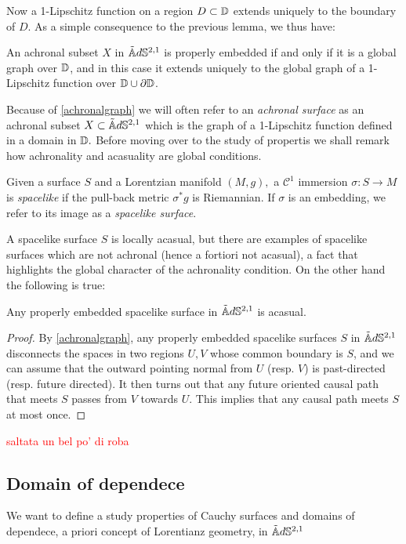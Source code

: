 Now a 1-Lipschitz function on a region $D\subset \mathbb{D}$ extends uniquely to the boundary of $D$. As a simple consequence to the previous lemma, we thus have: 

\begin{lemma}\label{achronalgraph}
    An achronal subset $X$ in $\tilde{\mathbb{A}}d\mathbb{S}^{2,1}$ is properly embedded if and only if it is a global graph over $\mathbb{D}$, and in this case it extends uniquely to the global graph of a 1-Lipschitz function over $\mathbb{D}\cup\partial\mathbb{D}$.
\end{lemma}

Because of \ref{achronalgraph} we will often refer to an \textit{achronal surface} as an achronal subset $X\subset\tilde{\mathbb{A}}d\mathbb{S}^{2,1}$ which is the graph of a 1-Lipschitz function defined in a domain in $\mathbb{D}.$ Before moving over to the study of propertis we shall remark how achronality and acasuality are global conditions.

\begin{definition} Given a surface $S$ and a Lorentzian manifold $(M,g),$ a $\mathcal{C}^1$ immersion $\sigma:S\to M$ is \textit{spacelike} if the pull-back metric $\sigma^*g$ is Riemannian. If $\sigma$ is an embedding, we refer to its image as a \textit{spacelike surface}.
\end{definition}

A spacelike surface $S$ is locally acasual, but there are examples of spacelike surfaces which are not achronal (hence a fortiori not acasual), a fact that highlights the global character of the achronality condition. On the other hand the following is true: 

\begin{lemma}
    Any properly embedded spacelike surface in $\tilde{\mathbb{A}}d\mathbb{S}^{2,1}$ is acasual. 
\end{lemma}
\begin{proof}
    By \ref{achronalgraph}, any properly embedded spacelike surfaces $S$ in $\tilde{\mathbb{A}}d\mathbb{S}^{2,1}$ disconnects the spaces in two regions $U,V$ whose common boundary is $S$, and we can assume that the outward pointing normal from $U$ (resp. $V$) is past-directed (resp. future directed). It then turns out that any future oriented causal path that meets $S$ passes from $V$ towards $U$. This implies that any causal path meets $S$ at most once. 
\end{proof}

\textcolor{red}{saltata un bel po' di roba}

\subsection{Domain of dependece}
We want to define a study properties of Cauchy surfaces and domains of dependece, a priori concept of Lorentianz geometry, in $\tilde{\mathbb{A}}d\mathbb{S}^{2,1}$

